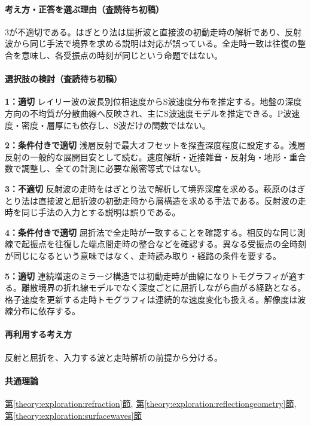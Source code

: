 \paragraph{考え方・正答を選ぶ理由（査読待ち初稿）} 3が不適切である。はぎとり法は屈折波と直接波の初動走時の解析であり、反射波から同じ手法で境界を求める説明は対応が誤っている。全走時一致は往復の整合を意味し、各受振点の時刻が同じという命題ではない。

\paragraph{選択肢の検討（査読待ち初稿）}\mbox{}\par

\noindent\textbf{1：適切} レイリー波の波長別位相速度からS波速度分布を推定する。地盤の深度方向の不均質が分散曲線へ反映され、主にS波速度モデルを推定できる。P波速度・密度・層厚にも依存し、S波だけの関数ではない。\par

\noindent\textbf{2：条件付きで適切} 浅層反射で最大オフセットを探査深度程度に設定する。浅層反射の一般的な展開目安として読む。速度解析・近接雑音・反射角・地形・重合数で調整し、全ての計測に必要な厳密等式ではない。\par

\noindent\textbf{3：不適切} 反射波の走時をはぎとり法で解析して境界深度を求める。萩原のはぎとり法は直接波と屈折波の初動走時から層構造を求める手法である。反射波の走時を同じ手法の入力とする説明は誤りである。\par

\noindent\textbf{4：条件付きで適切} 屈折法で全走時が一致することを確認する。相反的な同じ測線で起振点を往復した端点間走時の整合などを確認する。異なる受振点の全時刻が同じになるという意味ではなく、走時読み取り・経路の条件を要する。\par

\noindent\textbf{5：適切} 連続増速のミラージ構造では初動走時が曲線になりトモグラフィが適する。離散境界の折れ線モデルでなく深度ごとに屈折しながら曲がる経路となる。格子速度を更新する走時トモグラフィは連続的な速度変化も扱える。解像度は波線分布に依存する。\par

\paragraph{再利用する考え方} 反射と屈折を、入力する波と走時解析の前提から分ける。

\paragraph{共通理論} \hyperref[theory:exploration:refraction]{第\ref*{theory:exploration:refraction}節}, \hyperref[theory:exploration:reflectiongeometry]{第\ref*{theory:exploration:reflectiongeometry}節}, \hyperref[theory:exploration:surfacewaves]{第\ref*{theory:exploration:surfacewaves}節}

